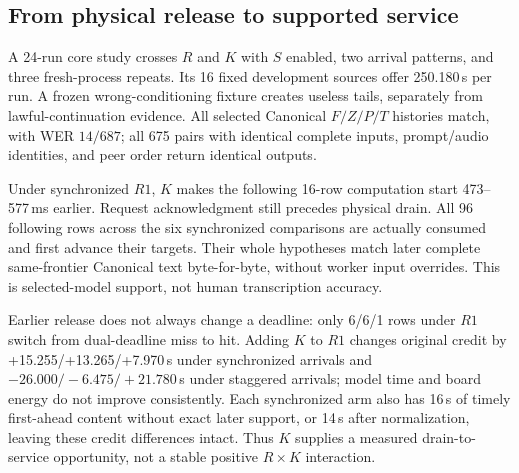 \subsection{From physical release to supported service}
\label{subsec:release_evidence}
A 24-run core study crosses $R$ and $K$ with $S$ enabled, two arrival
patterns, and three fresh-process repeats. Its 16 fixed development
sources offer 250.180\,s per run. A frozen wrong-conditioning fixture
creates useless tails, separately from lawful-continuation evidence.
All selected Canonical $F/Z/P/T$ histories match, with WER $14/687$;
all 675 pairs with identical complete inputs, prompt/audio identities,
and peer order return identical outputs.

Under synchronized $R1$, $K$ makes the following 16-row computation
start 473--577\,ms earlier. Request acknowledgment still precedes physical
drain. All 96 following rows across the six synchronized comparisons
are actually consumed and first advance their targets. Their whole
hypotheses match later complete same-frontier Canonical text byte-for-byte,
without worker input overrides. This is selected-model support, not
human transcription accuracy.

Earlier release does not always change a deadline: only 6/6/1 rows under
$R1$ switch from dual-deadline miss to hit. Adding
$K$ to $R1$ changes original credit by +15.255/+13.265/+7.970\,s under
synchronized arrivals and $-26.000/-6.475/+21.780$\,s under staggered
arrivals; model time and board energy do not improve consistently.
Each synchronized arm also has 16\,s of timely first-ahead content
without exact later support, or 14\,s after normalization, leaving these
credit differences intact. Thus $K$ supplies a measured drain-to-service
opportunity, not a stable positive $R\times K$ interaction.

